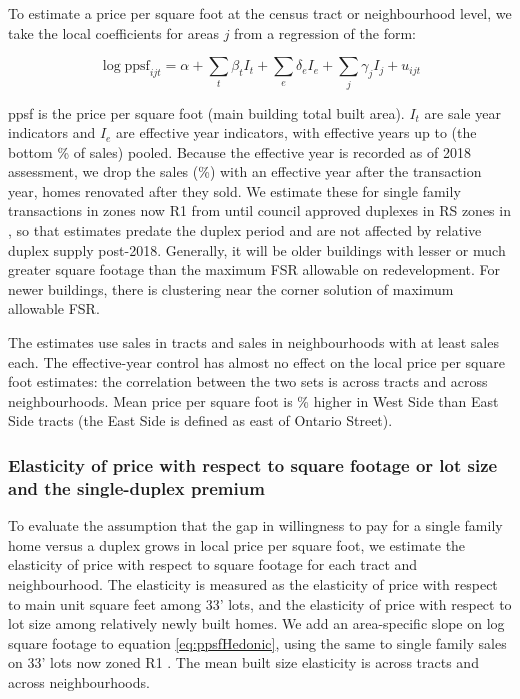 \documentclass[12pt]{article}
\begin{document}
To estimate a price per square foot at the census tract or neighbourhood level, we take the local coefficients for areas $j$ from a regression of the form:

\begin{equation}
	\label{eq:ppsfHedonic}
	\log \text{ppsf}_{ijt} = \alpha + \sum_{t}\beta_{t}I_{t} + \sum_{e}\delta_{e}I_{e} + \sum_{j}\gamma_{j}I_{j} + u_{ijt}
\end{equation}

ppsf is the price per square foot (main building total built area). $I_{t}$ are sale year indicators and $I_{e}$ are effective year indicators, with effective years up to \ppsfEffBinYear{} (the bottom \ppsfEffBinShare\% of sales) pooled. Because the effective year is recorded as of 2018 assessment, we drop the \ppsfAgeNonPos{} sales (\ppsfAgeNonPosShare\%) with an effective year after the transaction year, homes renovated after they sold. We estimate these for single family transactions in zones now R1 from \ppsfFirstYear{} until council approved duplexes in RS zones in \duplexCouncilMonth{} \ppsfLastYear{}, so that estimates predate the duplex period and are not affected by relative duplex supply post-2018. Generally, it will be older buildings with lesser or much greater square footage than the maximum FSR allowable on redevelopment. For newer buildings, there is clustering near the corner solution of maximum allowable FSR.

The estimates use \ppsfSalesTract{} sales in \ppsfNTract{} tracts and \ppsfSalesNbhd{} sales in \ppsfNNbhd{} neighbourhoods with at least \ppsfMinObs{} sales each. The effective-year control has almost no effect on the local price per square foot estimates: the correlation between the two sets is \ppsfCorEffTract{} across tracts and \ppsfCorEffNbhd{} across neighbourhoods. Mean price per square foot is \ppsfWestPremiumTract\% higher in West Side than East Side tracts (the East Side is defined as east of Ontario Street).

\subsubsection{Elasticity of price with respect to square footage or lot size and the single-duplex premium}

To evaluate the assumption that the gap in willingness to pay for a single family home versus a duplex grows in local price per square foot, we estimate the elasticity of price with respect to square footage for each tract and neighbourhood. The elasticity is measured as the elasticity of price with respect to main unit square feet among 33' lots, and the elasticity of price with respect to lot size among relatively newly built homes. We add an area-specific slope on log square footage to equation \eqref{eq:ppsfHedonic}, using the same \ppsfFirstYear{} to \duplexCouncilMonth{} \ppsfLastYear{} single family sales on 33' lots now zoned R1 \parencite{BCAssessment2019}. The mean built size elasticity is \elasMeanTract{} across tracts and \elasMeanNbhd{} across neighbourhoods. 
\end{document}
